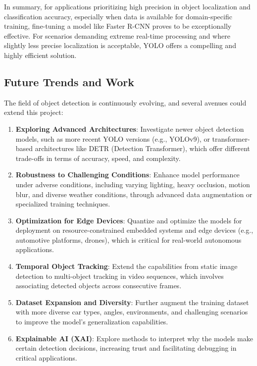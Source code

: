 \documentclass[12pt,a4paper]{article}
\begin{document}
In summary, for applications prioritizing high precision in object localization and classification accuracy, especially when data is available for domain-specific training, fine-tuning a model like Faster R-CNN proves to be exceptionally effective. For scenarios demanding extreme real-time processing and where slightly less precise localization is acceptable, YOLO offers a compelling and highly efficient solution.

\subsection{Future Trends and Work}

The field of object detection is continuously evolving, and several avenues could extend this project:

\begin{enumerate}
    \item \textbf{Exploring Advanced Architectures}: Investigate newer object detection models, such as more recent YOLO versions (e.g., YOLOv9), or transformer-based architectures like DETR (Detection Transformer), which offer different trade-offs in terms of accuracy, speed, and complexity.
    \item \textbf{Robustness to Challenging Conditions}: Enhance model performance under adverse conditions, including varying lighting, heavy occlusion, motion blur, and diverse weather conditions, through advanced data augmentation or specialized training techniques.
    \item \textbf{Optimization for Edge Devices}: Quantize and optimize the models for deployment on resource-constrained embedded systems and edge devices (e.g., automotive platforms, drones), which is critical for real-world autonomous applications.
    \item \textbf{Temporal Object Tracking}: Extend the capabilities from static image detection to multi-object tracking in video sequences, which involves associating detected objects across consecutive frames.
    \item \textbf{Dataset Expansion and Diversity}: Further augment the training dataset with more diverse car types, angles, environments, and challenging scenarios to improve the model's generalization capabilities.
    \item \textbf{Explainable AI (XAI)}: Explore methods to interpret why the models make certain detection decisions, increasing trust and facilitating debugging in critical applications.
\end{enumerate}



\renewcommand{\refname}{Literature} 

\label{sec:literature}

\nocite{*} 


\end{document}
